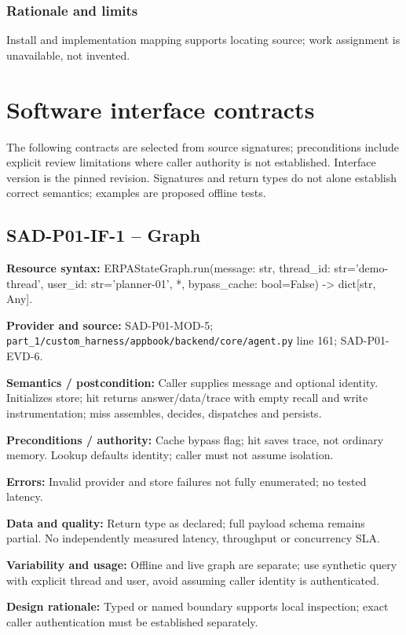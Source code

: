 \documentclass[10pt,letterpaper]{article}
\begin{document}
\subsubsection{Rationale and limits}
Install and implementation mapping supports locating source; work assignment is unavailable, not invented.

\section{Software interface contracts}
The following contracts are selected from source signatures; preconditions include explicit review limitations where caller authority is not established. Interface version is the pinned revision. Signatures and return types do not alone establish correct semantics; examples are proposed offline tests.
\subsection{SAD-P01-IF-1 -- Graph}
{\raggedright \textbf{Resource syntax:} ERPAStateGraph.run(\allowbreak{}message: str, thread\_\allowbreak{}id: str='demo-thread', user\_\allowbreak{}id: str='planner-01', *, bypass\_\allowbreak{}cache: bool=False) -> dict[str, Any].\par}
\textbf{Provider and source:} SAD-P01-MOD-5; \nolinkurl{part_1/custom_harness/appbook/backend/core/agent.py} line 161; SAD-P01-EVD-6.\par
\textbf{Semantics / postcondition:} Caller supplies message and optional identity. Initializes store; hit returns answer/data/trace with empty recall and write instrumentation; miss assembles, decides, dispatches and persists.\par
\textbf{Preconditions / authority:} Cache bypass flag; hit saves trace, not ordinary memory. Lookup defaults identity; caller must not assume isolation.\par
\textbf{Errors:} Invalid provider and store failures not fully enumerated; no tested latency.\par
\textbf{Data and quality:} Return type as declared; full payload schema remains partial. No independently measured latency, throughput or concurrency SLA.\par
\textbf{Variability and usage:} Offline and live graph are separate; use synthetic query with explicit thread and user, avoid assuming caller identity is authenticated.\par
\textbf{Design rationale:} Typed or named boundary supports local inspection; exact caller authentication must be established separately.\par
\end{document}
